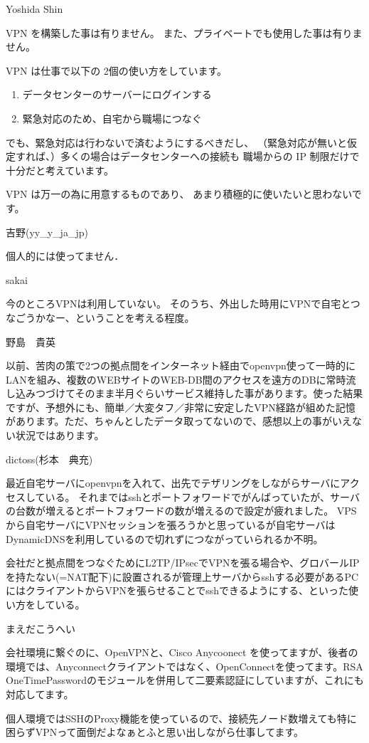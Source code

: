 
\begin{prework}{ Yoshida Shin }

VPN を構築した事は有りません。
また、プライベートでも使用した事は有りません。

VPN は仕事で以下の 2個の使い方をしています。
\begin{enumerate}
 \item  データセンターのサーバーにログインする
 \item  緊急対応のため、自宅から職場につなぐ
\end{enumerate}

でも、緊急対応は行わないで済むようにするべきだし、
（緊急対応が無いと仮定すれば、）多くの場合はデータセンターへの接続も
職場からの IP 制限だけで十分だと考えています。

VPN は万一の為に用意するものであり、
あまり積極的に使いたいと思わないです。
\end{prework}

\begin{prework}{ 吉野(yy\_{}y\_{}ja\_{}jp) }

個人的には使ってません．
\end{prework}

\begin{prework}{ sakai }

今のところVPNは利用していない。
そのうち、外出した時用にVPNで自宅とつなごうかなー、ということを考える程度。
\end{prework}

\begin{prework}{ 野島　貴英 }

以前、苦肉の策で2つの拠点間をインターネット経由でopenvpn使って一時的にLANを組み、複数のWEBサイトのWEB-DB間のアクセスを遠方のDBに常時流し込みつづけてそのまま半月ぐらいサービス維持した事があります。使った結果ですが、予想外にも、簡単／大変タフ／非常に安定したVPN経路が組めた記憶があります。ただ、ちゃんとしたデータ取ってないので、感想以上の事がいえない状況ではあります。
\end{prework}

\begin{prework}{ dictoss(杉本　典充) }

最近自宅サーバにopenvpnを入れて、出先でテザリングをしながらサーバにアクセスしている。
それまではsshとポートフォワードでがんばっていたが、サーバの台数が増えるとポートフォワードの数が増えるので設定が疲れました。
VPSから自宅サーバにVPNセッションを張ろうかと思っているが自宅サーバはDynamicDNSを利用しているので切れずにつながっていられるか不明。

会社だと拠点間をつなぐためにL2TP/IPsecでVPNを張る場合や、グロバールIPを持たない(=NAT配下)に設置されるが管理上サーバからsshする必要があるPCにはクライアントからVPNを張らせることでsshできるようにする、といった使い方をしている。
\end{prework}

\begin{prework}{ まえだこうへい }

会社環境に繋ぐのに、OpenVPNと、Cisco Anycoonect を使ってますが、後者の環境では、Anyconnectクライアントではなく、OpenConnectを使ってます。RSA OneTimePasswordのモジュールを併用して二要素認証にしていますが、これにも対応してます。

個人環境ではSSHのProxy機能を使っているので、接続先ノード数増えても特に困らずVPNって面倒だよなぁとふと思い出しながら仕事してます。
\end{prework}
